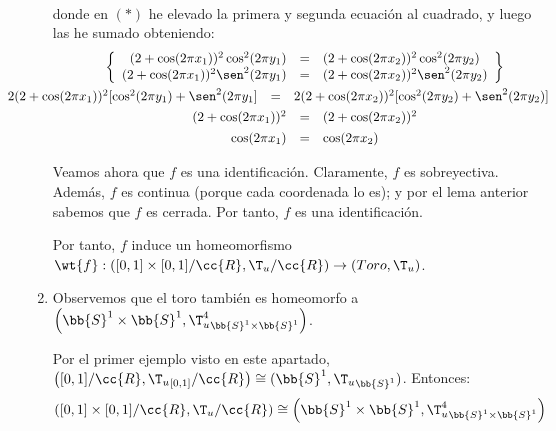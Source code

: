 \begin{ejemplo}
\begin{enumerate}
\begin{equation*}
\begin{split}
            \end{split}
        \end{equation*}
        donde en $(\ast)$ he elevado la primera y segunda ecuación al cuadrado, y luego las he sumado obteniendo:
        \begin{gather*}
            \left\{
            \begin{array}{rcl}
                (2+\cos(2\pi x_1))^2\cos^2(2\pi y_1) & = & (2+\cos(2\pi x_2))^2\cos^2(2\pi y_2)  \\
                (2+\cos(2\pi x_1))^2\sen^2(2\pi y_1) & = & (2+\cos(2\pi x_2))^2\sen^2(2\pi y_2)
            \end{array}
            \right\} \\
            \hspace{-1.42cm}
            \begin{array}{rcl}
                2(2+\cos(2\pi x_1))^2[\cos^2(2\pi y_1)+\sen^2(2\pi y_1] & = & 2(2+\cos(2\pi x_2))^2[\cos^2(2\pi y_2)+\sen^2(2\pi y_2)]
            \end{array}
             \\
            \begin{array}{rcl}
                (2+\cos(2\pi x_1))^2 & = & (2+\cos(2\pi x_2))^2
            \end{array}
            \\
            \begin{array}{rcl}
                \cos(2\pi x_1) & = & \cos(2\pi x_2)
            \end{array}
        \end{gather*}

        Veamos ahora que $f$ es una identificación. Claramente, $f$ es sobreyectiva. Además, $f$ es continua (porque cada coordenada lo es); y por el lema anterior sabemos que $f$ es cerrada. Por tanto, $f$ es una identificación.

        Por tanto, $f$ induce un homeomorfismo $\wt{f}:\left([0,1]\times [0,1]/\cc{R}, \T_u/\cc{R}\right)\to (Toro, \T_u)$.

        \item Observemos que el toro también es homeomorfo a $\left(\bb{S}^1\times \bb{S}^1, {\T_u^4}_{\bb{S}^1\times \bb{S}^1}\right)$.


        Por el primer ejemplo visto en este apartado, $\left([0,1]/\cc{R},{\T_u}_{[0,1]}/\cc{R}\right)\cong (\bb{S}^1,{\T_u}_{\bb{S}^1})$. Entonces:
        \begin{equation*}
            \left([0,1]\times [0,1]/\cc{R},{\T_u}/\cc{R}\right)\cong \left(\bb{S}^1\times \bb{S}^1, {\T_u^4}_{\bb{S}^1\times \bb{S}^1}\right)
        \end{equation*}



\end{enumerate}
\end{ejemplo}
